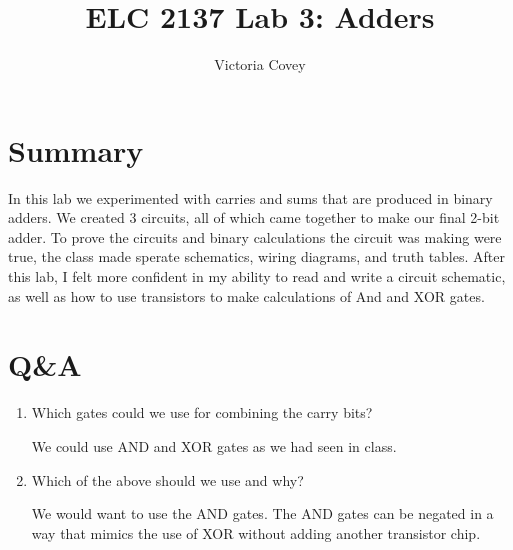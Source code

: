 \documentclass[11pt]{article}
\begin{document}
\title{ELC 2137 Lab 3: Adders}
\author{Victoria Covey}

\maketitle


\section*{Summary}

In this lab we experimented with carries and sums that are produced in binary adders. We created 3 circuits, all of which came together to make our final 2-bit adder. To prove the circuits and binary calculations the circuit was making were true, the class made sperate schematics, wiring diagrams, and truth tables. After this lab, I felt more confident in my ability to read and write a circuit schematic, as well as how to use transistors to make calculations of And and XOR gates.

\section*{Q\&A}
\begin{enumerate}
	\item Which gates could we use for combining the carry bits?
	
	We could use AND and XOR gates as we had seen in class.
	
	\item Which of the above should we use and why?
	
	We would want to use the AND gates. The AND gates can be negated in a way that mimics the use of XOR without adding another transistor chip.

\end{enumerate}
\end{document}
